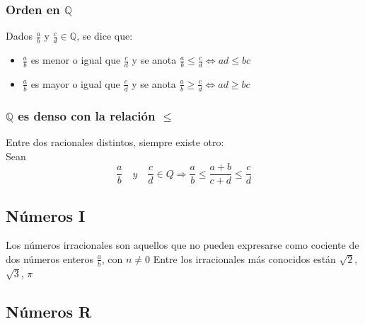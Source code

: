       \subsubsection{Orden en $\mathbb{Q}$}
      Dados $\frac{a}{b}$ y  $\frac{c}{d} \in \mathbb{Q}$, se dice que:
      \begin{itemize}
       \item $\frac{a}{b}$ es menor o igual que $\frac{c}{d}$ y se anota $\frac{a}{b} \leq \frac{c}{d} \Leftrightarrow ad \leq bc$ 
       \item $\frac{a}{b}$ es mayor o igual que $\frac{c}{d}$ y se anota $\frac{a}{b} \geq \frac{c}{d} \Leftrightarrow ad \geq bc$ 
      \end{itemize}
       \subsubsection{$\mathbb{Q}$ es denso con la relaci\'on $\leq$}
      Entre dos racionales distintos, siempre existe otro: \\ Sean \[\frac{a}{b}\quad y \quad \frac{c}{d} \in Q \Rightarrow   \frac{a}{b} \leq \frac{a+b}{c+d} \leq \frac{c}{d} \]

   \subsection{N\'umeros I}
   Los n\'umeros irracionales son aquellos que no pueden expresarse como cociente de dos n\'umeros enteros $\frac{a}{b}$, con $n \neq 0$ \newline Entre los irracionales m\'as conocidos est\'an $\sqrt{2}$, $\sqrt{3}$, $\pi$

    \subsection{N\'umeros R}
